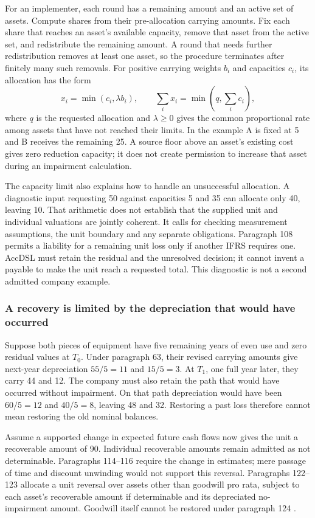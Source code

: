 For an implementer, each round has a remaining amount and an active set of
assets. Compute shares from their pre-allocation carrying amounts. Fix each
share that reaches an asset's available capacity, remove that asset from the
active set, and redistribute the remaining amount. A round that needs further
redistribution removes at least one asset, so the procedure terminates after
finitely many such removals. For positive carrying weights $b_i$ and
capacities $c_i$, its allocation has the form
\[
 x_i=\min(c_i,\lambda b_i),\qquad
 \sum_i x_i=\min\!\left(q,\sum_i c_i\right),
\]
where $q$ is the requested allocation and $\lambda\geq0$ gives the common
proportional rate among assets that have not reached their limits. In the
example A is fixed at 5 and B receives the remaining 25. A source floor above
an asset's existing cost gives zero reduction capacity; it does not create
permission to increase that asset during an impairment calculation.

The capacity limit also explains how to handle an unsuccessful allocation.
A diagnostic input requesting 50 against capacities 5 and 35 can allocate
only 40, leaving 10. That arithmetic does not establish that the supplied
unit and individual valuations are jointly coherent. It calls for checking
measurement assumptions, the unit boundary and any separate obligations.
Paragraph 108 permits a liability for a remaining unit loss only if another
IFRS requires one. AccDSL must retain the residual and the unresolved decision;
it cannot invent a payable to make the unit reach a requested total. This
diagnostic is not a second admitted company example.

\subsubsection{A recovery is limited by the depreciation that would have occurred}
\label{sec:impairment-reversal-memory}

Suppose both pieces of equipment have five remaining years of even use and
zero residual values at $T_0$. Under paragraph 63, their revised carrying
amounts give next-year depreciation $55/5=11$ and $15/5=3$. At $T_1$, one
full year later, they carry 44 and 12. The company must also retain the path
that would have occurred without impairment. On that path depreciation would
have been $60/5=12$ and $40/5=8$, leaving 48 and 32. Restoring a past loss
therefore cannot mean restoring the old nominal balances.

Assume a supported change in expected future cash flows now gives the unit a
recoverable amount of 90. Individual recoverable amounts remain admitted as
not determinable. Paragraphs 114--116 require the change in estimates; mere
passage of time and discount unwinding would not support this reversal.
Paragraphs 122--123 allocate a unit reversal over assets other than goodwill
pro rata, subject to each asset's recoverable amount if determinable and its
depreciated no-impairment amount. Goodwill itself cannot be restored under
paragraph 124 \citep{eu20231803}.

